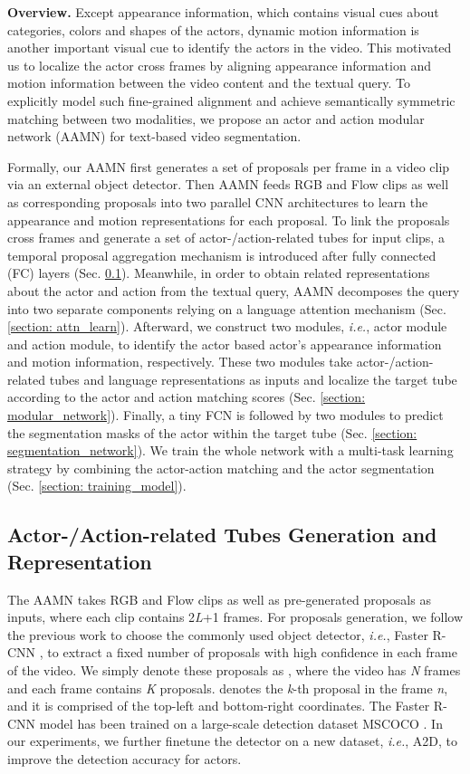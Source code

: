 \documentclass[journal]{IEEEtran}
\begin{document}
\textbf{Overview.}
Except appearance information, which contains visual cues about categories, colors and shapes of the actors, dynamic motion information is another important visual cue to identify the actors in the video. This motivated us to localize the actor cross frames by aligning appearance information and motion information between the video content and the textual query. To explicitly model such fine-grained alignment and achieve semantically symmetric matching between two modalities, we propose an actor and action modular network (AAMN) for text-based video segmentation.

Formally, our AAMN first generates a set of proposals per frame in a video clip via an external object detector. Then AAMN feeds RGB and Flow clips as well as corresponding proposals into two parallel CNN architectures to learn the appearance and motion representations for each proposal. To link the proposals cross frames and generate a set of actor-/action-related tubes for input clips, a temporal proposal aggregation mechanism is introduced after fully connected (FC) layers (Sec. \ref{section: tube_generation}). Meanwhile, in order to obtain related representations about the actor and action from the textual query, AAMN decomposes the query into two separate components relying on a language attention mechanism (Sec. \ref{section: attn_learn}). Afterward, we construct two modules, \emph{i.e.}, actor module and action module, to identify the actor based actor's appearance information and motion information, respectively. These two modules take actor-/action-related tubes and language representations as inputs and localize the target tube according to the actor and action matching scores (Sec. \ref{section: modular_network}). Finally, a tiny FCN is followed by two modules to predict the segmentation masks of the actor within the target tube (Sec. \ref{section: segmentation_network}). We train the whole network with a multi-task learning strategy by combining the actor-action matching and the actor segmentation (Sec. \ref{section: training_model}).

\subsection{Actor-/Action-related Tubes Generation and Representation}
\label{section: tube_generation}

The AAMN takes RGB and Flow clips as well as pre-generated proposals as inputs, where each clip contains 2\emph{L}+1 frames. For proposals generation, we follow the previous work \cite{kalogeiton2017joint} to choose the commonly used object detector, \emph{i.e.}, Faster R-CNN \cite{ren2015faster}, to extract a fixed number of proposals with high confidence in each frame of the video. We simply denote these proposals as , where the video has \emph{N} frames and each frame contains \emph{K} proposals.  denotes the \emph{k}-th proposal in the frame \emph{n}, and it is comprised of the top-left and bottom-right coordinates. The Faster R-CNN model has been trained on a large-scale detection dataset MSCOCO \cite{lin2014microsoft}. In our experiments, we further finetune the detector on a new dataset, \emph{i.e.}, A2D, to improve the detection accuracy for actors.
\end{document}
